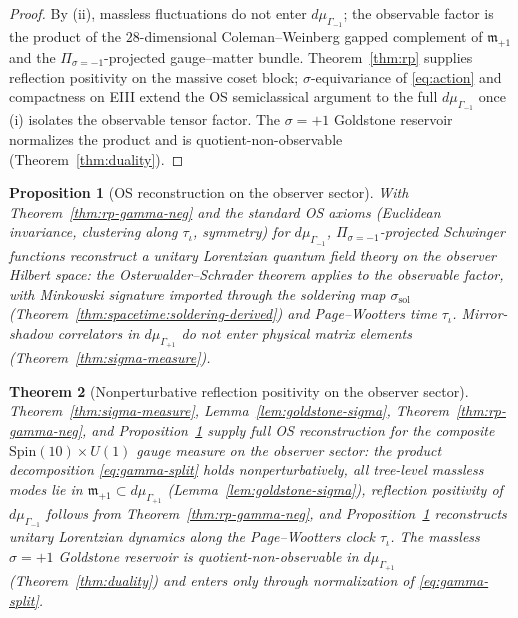 \documentclass[11pt]{article}
\theoremstyle{plain}
\newtheorem{theorem}{Theorem}[section]
\newtheorem{proposition}[theorem]{Proposition}
\theoremstyle{definition}
\theoremstyle{remark}
\numberwithin{equation}{section}
\newcommand{\Spin}{\mathrm{Spin}}
\begin{document}
\begin{proof}
By (ii), massless fluctuations do not enter $d\mu_{\Gamma_{-1}}$; the
observable factor is the product of the $28$-dimensional Coleman--Weinberg
gapped complement of $\mathfrak{m}_{+1}$ and the $\Pi_{\sigma=-1}$-projected
gauge--matter bundle. Theorem~\ref{thm:rp} supplies reflection positivity on
the massive coset block; $\sigma$-equivariance of \eqref{eq:action} and
compactness on EIII extend the OS semiclassical argument to the full
$d\mu_{\Gamma_{-1}}$ once (i) isolates the observable tensor factor. The
$\sigma=+1$ Goldstone reservoir normalizes the product and is
quotient-non-observable (Theorem~\ref{thm:duality}).
\end{proof}

\begin{proposition}[OS reconstruction on the observer sector]
\label{prop:os-observer}
With Theorem~\ref{thm:rp-gamma-neg} and the standard
OS axioms (Euclidean invariance, clustering along $\tau_\iota$, symmetry)
for $d\mu_{\Gamma_{-1}}$, $\Pi_{\sigma=-1}$-projected Schwinger
functions reconstruct a unitary Lorentzian quantum field theory on the
observer Hilbert space: the Osterwalder--Schrader theorem
\cite{OsterwalderSchrader1973} applies to the observable factor, with
Minkowski signature imported through the soldering map
$\sigma_{\mathrm{sol}}$ (Theorem~\ref{thm:spacetime:soldering-derived}) and
Page--Wootters time $\tau_\iota$. Mirror-shadow correlators in
$d\mu_{\Gamma_{+1}}$ do not enter physical matrix elements
(Theorem~\ref{thm:sigma-measure}).
\end{proposition}

\begin{theorem}[Nonperturbative reflection positivity on the observer sector]
\label{thm:rp-complete}
Theorem~\ref{thm:sigma-measure}, Lemma~\ref{lem:goldstone-sigma},
Theorem~\ref{thm:rp-gamma-neg}, and Proposition~\ref{prop:os-observer}
supply full OS reconstruction for the composite
$\Spin(10)\times U(1)$ gauge measure on the observer sector: the product
decomposition \eqref{eq:gamma-split} holds nonperturbatively, all tree-level
massless modes lie in $\mathfrak{m}_{+1}\subset d\mu_{\Gamma_{+1}}$
(Lemma~\ref{lem:goldstone-sigma}), reflection positivity of
$d\mu_{\Gamma_{-1}}$ follows from Theorem~\ref{thm:rp-gamma-neg}, and
Proposition~\ref{prop:os-observer} reconstructs unitary Lorentzian dynamics
along the Page--Wootters clock $\tau_\iota$. The massless
$\sigma=+1$ Goldstone reservoir is quotient-non-observable in
$d\mu_{\Gamma_{+1}}$ (Theorem~\ref{thm:duality}) and enters only through
normalization of \eqref{eq:gamma-split}.
\end{theorem}
\end{document}
